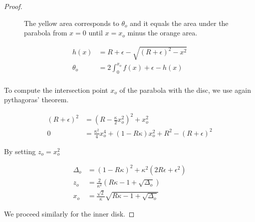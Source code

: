\begin{proof}
\begin{figure}[h!]
{	}
\caption{The yellow area corresponds to $\theta_o$ and it equals the area under the parabola from $x=0$ until $x=x_o$ minus the orange area.}
\end{figure}

\begin{align*}
	h(x) &= R+\epsilon - \sqrt{ (R+\epsilon)^2 - x^2}\\
	\theta_o &= 2\int_0^{x_o}{f(x) + \epsilon - h(x)}\\
\end{align*}

To compute the intersection point $x_o$ of the parabola with the disc, we use again pythagoras' theorem.

\begin{align*}
	(R+\epsilon)^2 &= (R-\frac{\kappa}{2}x_o^2)^2 + x_o^2\\
	0 &= \frac{\kappa^2}{4}x_o^4 + (1-R\kappa)x_o^2 + R^2 - (R+\epsilon)^2
\end{align*}

By setting $z_o=x_o^2$

\begin{align*}
\Delta_o &= (1-R\kappa)^2 + \kappa^2(2R\epsilon + \epsilon^2)\\
z_o &= \frac{2}{\kappa^2}(R\kappa-1 + \sqrt{\Delta_o})\\
x_o &= \frac{\sqrt{2}}{\kappa}\sqrt{R\kappa-1+\sqrt{\Delta_o}}
\end{align*}

We proceed similarly for the inner disk.



\end{proof}
